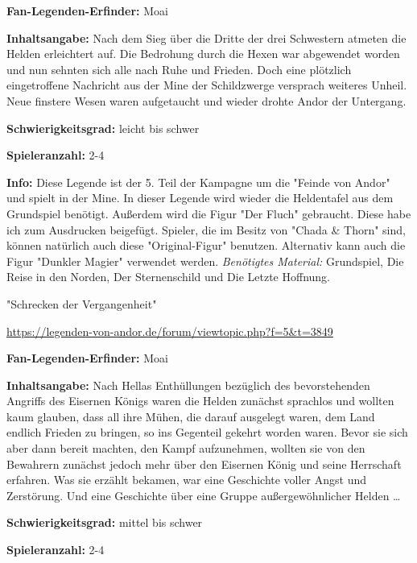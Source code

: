 {\textbf{Fan-Legenden-Erfinder:} Moai

\textbf{Inhaltsangabe:}
Nach dem Sieg über die Dritte der drei Schwestern atmeten die Helden erleichtert auf. Die Bedrohung durch die Hexen war abgewendet worden und nun sehnten sich alle nach Ruhe und Frieden. Doch eine plötzlich eingetroffene Nachricht aus der Mine der Schildzwerge versprach weiteres Unheil. Neue finstere Wesen waren aufgetaucht und wieder drohte Andor der Untergang.

\textbf{Schwierigkeitsgrad:} leicht bis schwer

\textbf{Spieleranzahl:} 2-4

\textbf{Info:}
Diese Legende ist der 5. Teil der Kampagne um die "Feinde von Andor" und spielt in der Mine. In dieser Legende wird wieder die Heldentafel aus dem Grundspiel benötigt. Außerdem wird die Figur "Der Fluch" gebraucht. Diese habe ich zum Ausdrucken beigefügt. Spieler, die im Besitz von "Chada \& Thorn" sind, können natürlich auch diese "Original-Figur" benutzen. Alternativ kann auch die Figur "Dunkler Magier" verwendet werden.
\textit{Benötigtes Material:} Grundspiel, Die Reise in den Norden, Der Sternenschild und Die Letzte Hoffnung.









\begin{center}
    "Schrecken der Vergangenheit"

    \url{https://legenden-von-andor.de/forum/viewtopic.php?f=5&t=3849}
\end{center}

\textbf{Fan-Legenden-Erfinder:} Moai

\textbf{Inhaltsangabe:}
Nach Hellas Enthüllungen bezüglich des bevorstehenden Angriffs des Eisernen Königs waren die Helden zunächst sprachlos und wollten kaum glauben, dass all ihre Mühen, die darauf ausgelegt waren, dem Land endlich Frieden zu bringen, so ins Gegenteil gekehrt worden waren. Bevor sie sich aber dann bereit machten, den Kampf aufzunehmen, wollten sie von den Bewahrern zunächst jedoch mehr über den Eisernen König und seine Herrschaft erfahren.
Was sie erzählt bekamen, war eine Geschichte voller Angst und Zerstörung. Und eine Geschichte über eine Gruppe außergewöhnlicher Helden …

\textbf{Schwierigkeitsgrad:} mittel bis schwer

\textbf{Spieleranzahl:} 2-4

}
